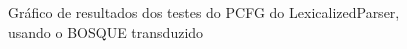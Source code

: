 \begin{figure}[!ht]
    \centering
    
    \caption[Gráfico de resultados dos testes usando o BOSQUE transduzido]{Gráfico de resultados dos testes do PCFG do LexicalizedParser, usando o BOSQUE transduzido}
    \label{fig:bosque_result_pcfg}
\end{figure}
